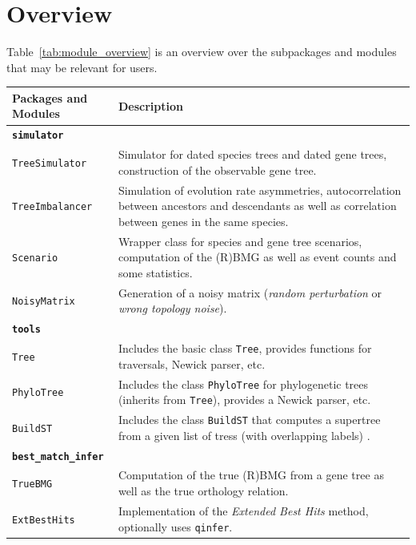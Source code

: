 \documentclass[hidelinks,11pt]{scrreprt}
\begin{document}
\section{Overview}

Table~\ref{tab:module_overview} is an overview over the subpackages and modules that may be relevant for users.

\begin{table}[H]
	\footnotesize
	\setlength{\tabcolsep}{6pt}
	\renewcommand{\arraystretch}{1.4}
	\begin{tabularx}{\textwidth}{|p{}|X|}
		\hline
		\textbf{Packages and Modules} & \textbf{Description} \\
		\hline
		\multicolumn{2}{|l|}{\textbf{\texttt{simulator}}}\\
		\hline
		\texttt{TreeSimulator} & 
		Simulator for dated species trees and dated gene trees, construction of the observable gene tree. \\
		\texttt{TreeImbalancer} & 
		Simulation of evolution rate asymmetries, autocorrelation between ancestors and descendants as well as correlation between genes in the same species. \\
		\texttt{Scenario} & 
		Wrapper class for species and gene tree scenarios, computation of the (R)BMG as well as event counts and some statistics. \\
		\texttt{NoisyMatrix} & 
		Generation of a noisy matrix (\emph{random perturbation} or \emph{wrong topology noise}). \\
		\hline
		\multicolumn{2}{|l|}{\textbf{\texttt{tools}}}\\
		\hline
		\texttt{Tree} & 
		Includes the basic class \texttt{Tree}, provides functions for traversals, Newick parser, etc. \\
		\texttt{PhyloTree} & 
		Includes the class \texttt{PhyloTree} for phylogenetic trees (inherits from \texttt{Tree}), provides a Newick parser, etc. \\
		\texttt{BuildST} & 
		Includes the class \texttt{BuildST} that computes a supertree from a given list of tress (with overlapping labels) \citep{deng2016}. \\
		\hline
		\multicolumn{2}{|l|}{\textbf{\texttt{best\_match\_infer}}}\\
		\hline
		\texttt{TrueBMG} & 
		Computation of the true (R)BMG from a gene tree as well as the true orthology relation. \\
		\texttt{ExtBestHits} & 
		Implementation of the \emph{Extended Best Hits} method, optionally uses \texttt{qinfer}. \\

\end{tabularx}
\end{table}
\end{document}
